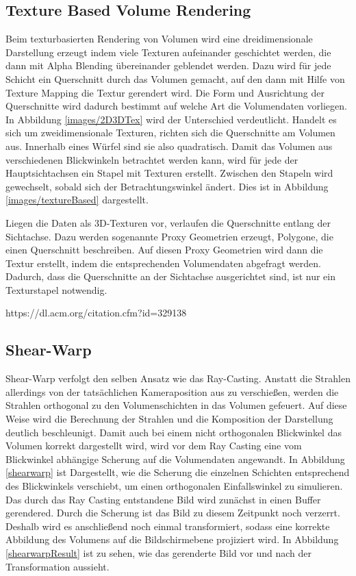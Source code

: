\subsection{Texture Based Volume Rendering}

Beim texturbasierten Rendering von Volumen wird eine dreidimensionale Darstellung erzeugt indem viele Texturen aufeinander geschichtet werden, die dann mit Alpha Blending übereinander geblendet werden. Dazu wird für jede Schicht ein Querschnitt durch das Volumen gemacht, auf den dann mit Hilfe von Texture Mapping die Textur gerendert wird.
Die Form und Ausrichtung der Querschnitte wird dadurch bestimmt auf welche Art die Volumendaten vorliegen. In Abbildung \ref{images/2D3DTex} wird der Unterschied verdeutlicht. Handelt es sich um zweidimensionale Texturen,  richten sich die Querschnitte am Volumen aus. Innerhalb eines Würfel sind sie also quadratisch. Damit das Volumen aus verschiedenen Blickwinkeln betrachtet werden kann, wird für jede der Hauptsichtachsen ein Stapel mit Texturen erstellt. Zwischen den Stapeln wird gewechselt, sobald sich der Betrachtungswinkel ändert. Dies ist in Abbildung \ref{images/textureBased} dargestellt.

Liegen die Daten als 3D-Texturen vor, verlaufen die Querschnitte entlang der Sichtachse. Dazu werden sogenannte Proxy Geometrien erzeugt, Polygone, die einen Querschnitt beschreiben. Auf diesen Proxy Geometrien wird dann die Textur erstellt, indem die entsprechenden Volumendaten abgefragt werden. Dadurch, dass die Querschnitte an der Sichtachse ausgerichtet sind, ist nur ein Texturstapel notwendig. 


https://dl.acm.org/citation.cfm?id=329138

\subsection{Shear-Warp}

Shear-Warp verfolgt den selben Ansatz wie das Ray-Casting. Anstatt die Strahlen allerdings von der tatsächlichen Kameraposition aus zu verschießen, werden die Strahlen orthogonal zu den Volumenschichten in das Volumen gefeuert. Auf diese Weise wird die Berechnung der Strahlen und die Komposition der Darstellung deutlich beschleunigt. 
Damit auch bei einem nicht orthogonalen Blickwinkel das Volumen korrekt dargestellt wird, wird vor dem Ray Casting eine vom Blickwinkel abhängige Scherung auf die Volumendaten angewandt. In Abbildung \ref{shearwarp} ist Dargestellt, wie die Scherung die einzelnen Schichten entsprechend des Blickwinkels verschiebt, um einen orthogonalen Einfallswinkel zu simulieren. 
Das durch das Ray Casting entstandene Bild wird zunächst in einen Buffer gerendered. Durch die Scherung ist das Bild zu diesem Zeitpunkt noch verzerrt. Deshalb wird es anschließend noch einmal transformiert, sodass eine korrekte Abbildung des Volumens auf die Bildschirmebene projiziert wird. In Abbildung \ref{shearwarpResult} ist zu sehen, wie das gerenderte Bild vor und nach der Transformation aussieht. 

